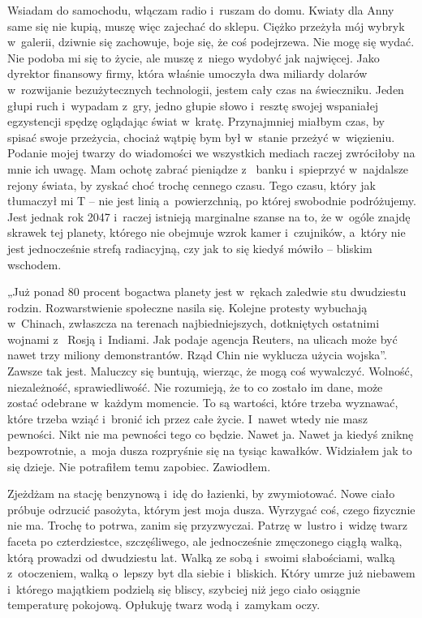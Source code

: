 Wsiadam do samochodu, włączam radio i~ruszam do domu. Kwiaty dla Anny same się nie kupią, muszę więc zajechać do 
sklepu. Ciężko przeżyła mój wybryk w~galerii, dziwnie się zachowuje, boje się, że coś podejrzewa. Nie mogę się wydać. 
Nie podoba mi się to życie, ale muszę z~niego wydobyć jak najwięcej. Jako dyrektor finansowy firmy, która właśnie 
umoczyła dwa miliardy dolarów w~rozwijanie bezużytecznych technologii, jestem cały czas na świeczniku. Jeden głupi 
ruch i~wypadam z~gry, jedno głupie słowo i~resztę swojej wspaniałej egzystencji spędzę oglądając świat w~kratę. 
Przynajmniej miałbym czas, by spisać swoje przeżycia, chociaż wątpię bym był w~stanie przeżyć w~więzieniu. Podanie 
mojej twarzy do wiadomości we wszystkich mediach raczej zwróciłoby na mnie ich uwagę. Mam ochotę zabrać pieniądze z~
banku i~spieprzyć w~najdalsze rejony świata, by zyskać choć trochę cennego czasu. Tego czasu, który jak tłumaczył mi 
T -- nie jest linią a~powierzchnią, po której swobodnie podróżujemy. Jest jednak rok 2047 i~raczej istnieją 
marginalne szanse na to, że w~ogóle znajdę skrawek tej planety, którego nie obejmuje wzrok kamer i~czujników, a~który 
nie jest jednocześnie strefą radiacyjną, czy jak to się kiedyś mówiło -- bliskim wschodem.

„Już ponad 80 procent bogactwa planety jest w~rękach zaledwie stu dwudziestu rodzin. Rozwarstwienie społeczne nasila 
się. Kolejne protesty wybuchają w~Chinach, zwłaszcza na terenach najbiedniejszych, dotkniętych ostatnimi wojnami z~
Rosją i~Indiami. Jak podaje agencja Reuters, na ulicach może być nawet trzy miliony demonstrantów. Rząd Chin nie 
wyklucza użycia wojska”. Zawsze tak jest. Maluczcy się buntują, wierząc, że mogą coś wywalczyć. Wolność, 
niezależność, sprawiedliwość. Nie rozumieją, że to co zostało im dane, może zostać odebrane w~każdym momencie. To są 
wartości, które trzeba wyznawać, które trzeba wziąć i~bronić ich przez całe życie. I~nawet wtedy nie masz pewności. 
Nikt nie ma pewności tego co będzie. Nawet ja. Nawet ja kiedyś zniknę bezpowrotnie, a~moja dusza rozpryśnie się na 
tysiąc kawałków. Widziałem jak to się dzieje. Nie potrafiłem temu zapobiec. Zawiodłem.

Zjeżdżam na stację benzynową i~idę do łazienki, by zwymiotować. Nowe ciało próbuje odrzucić pasożyta, którym jest 
moja dusza. Wyrzygać coś, czego fizycznie nie ma. Trochę to potrwa, zanim się przyzwyczai. Patrzę w~lustro i~widzę 
twarz faceta po czterdziestce, szczęśliwego, ale jednocześnie zmęczonego ciągłą walką, którą prowadzi od dwudziestu 
lat. Walką ze sobą i~swoimi słabościami, walką z~otoczeniem, walką o~lepszy byt dla siebie i~bliskich. Który umrze 
już niebawem i~którego majątkiem podzielą się bliscy, szybciej niż jego ciało osiągnie temperaturę pokojową. Opłukuję 
twarz wodą i~zamykam oczy.

